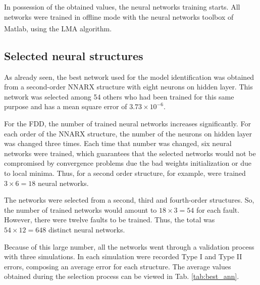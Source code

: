 \documentclass[10pt,fleqn,a4paper]{article}
\newcommand{\reg}{\textsuperscript{\textregistered}}
\begin{document}
In possession of the obtained values, the neural networks training starts. All
networks were trained in offline mode with the neural networks toolbox of
Matlab\reg, using the LMA algorithm.

\subsection{Selected neural structures}
As already seen, the best network used for the model identification was obtained
from a second-order NNARX structure with eight neurons on hidden layer. This
network was selected among 54 others who had been trained for this same purpose
and has a mean square error of $3.73 \times 10^{-6}$.

For the FDD, the number of trained neural networks increases significantly. For
each order of the NNARX structure, the number of the neurons on hidden layer was
changed three times. Each time that number was changed, six neural networks were
trained, which guarantees that the selected networks would not be compromised by
convergence problems due the bad weights initialization or due to local minima.
Thus, for a second order structure, for example, were trained $3 \times 6 = 18$
neural networks.

The networks were selected from a second, third and fourth-order structures. So,
the number of trained networks would amount to $18 \times 3 = 54$ for each
fault. However, there were twelve faults to be trained. Thus, the total was $54
\times 12 = 648$ distinct neural networks.

Because of this large number, all the networks went through a validation process
with three simulations. In each simulation were recorded Type I and Type II
errors, composing an average error for each structure. The average values
obtained during the selection process can be viewed in Tab. \ref{tab:best_ann}.
\end{document}

